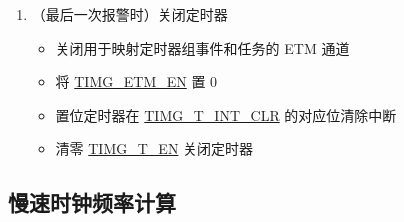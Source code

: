 \documentclass[main\_\_CN.tex]{subfiles}
\begin{document}
\begin{enumerate}
\begin{itemize}
        \item 当计数器达到报警值并触发警报时，硬件会产生 TG0\_EVT\_CNT\_CMP\_TIMER 与 TG1\_EVT\_CNT\_CMP\_TIMER 事件，同时报警被清除。
        \item 如果 \hyperref[fielddesc:TIMGTXAUTORELOAD]{TIMG\_T\_AUTORELOAD} 为 1，硬件会自动将重新加载值写入计数器，TG0\_TASK\_ALARM\_START\_TIMER 与 TG1\_TASK\_ALARM\_START\_TIMER 重新使能报警。
        \item 如果 \hyperref[fielddesc:TIMGTXAUTORELOAD]{TIMG\_T\_AUTORELOAD} 为 0，TG0\_TASK\_CNT\_RELOAD\_TIMER 与 TG1\_TASK\_CNT\_RELOAD\_TIMER 重新加载计数器，TG0\_TASK\_ALARM\_START\_TIMER 与 TG1\_TASK\_ALARM\_START\_TIMER 重新使能报警。
    \end{itemize}
    \item（最后一次报警时）关闭定时器
    \begin{itemize}
        \item 关闭用于映射定时器组事件和任务的 ETM 通道
        \item 将 \hyperref[fielddesc:TIMGETMEN]{TIMG\_ETM\_EN} 置 0
        \item 置位定时器在 \hyperref[fielddesc:TIMGTXINTCLR]{TIMG\_T\_INT\_CLR} 的对应位清除中断
        \item 清零 \hyperref[fielddesc:TIMGTXEN]{TIMG\_T\_EN} 关闭定时器
    \end{itemize}
\end{enumerate}

\subsection{慢速时钟频率计算}
\label{sec:rtc-calibration-procedure}
\end{document}
